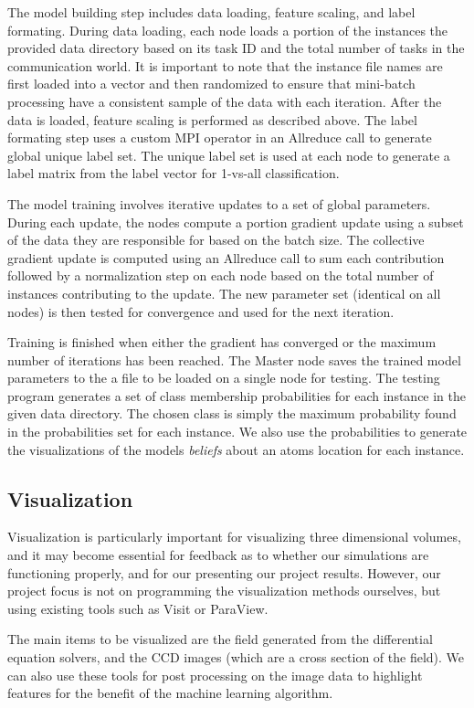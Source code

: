 The model building step includes data loading, feature scaling, and label formating. During data loading, each node loads a portion of the instances the provided data directory based on its task ID and the total number of tasks in the communication world.  It is important to note that the instance file names are first loaded into a vector and then randomized to ensure that mini-batch processing have a consistent sample of the data with each iteration.  After the data is loaded, feature scaling is performed as described above.  The label formating step uses a custom MPI operator in an Allreduce call to generate global unique label set.  The unique label set is used at each node to generate a label matrix from the label vector for 1-vs-all classification.

The model training involves iterative updates to a set of global parameters.  During each update, the nodes compute a portion gradient update using a subset of the data they are responsible for based on the batch size.  The collective gradient update is computed using an Allreduce call to sum each contribution followed by a normalization step on each node based on the total number of instances contributing to the update.  The new parameter set (identical on all nodes) is then tested for convergence and used for the next iteration.

Training is finished when either the gradient has converged or the maximum number of iterations has been reached.  The Master node saves the trained model parameters to the a file to be loaded on a single node for testing.  The testing program generates a set of class membership probabilities for each instance in the given data directory.  The chosen class is simply the maximum probability found in the probabilities set for each instance.  We also use the probabilities to generate the visualizations of the models \emph{beliefs} about an atoms location for each instance.

\subsection{Visualization}
Visualization is particularly important for visualizing three dimensional volumes, and it may become essential for feedback as to whether our simulations are functioning properly, and for our presenting our project results. However, our project focus is not on programming the visualization methods ourselves, but using existing tools such as Visit or ParaView.

The main items to be visualized are the field generated from the differential equation solvers, and the CCD images (which are a cross section of the field). We can also use these tools for post processing on the image data to highlight features for the benefit of the machine learning algorithm.